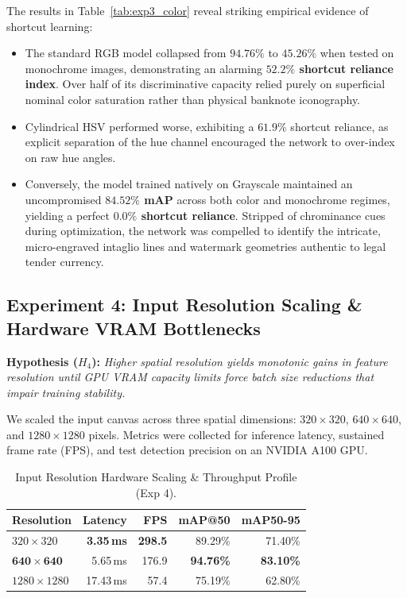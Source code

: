 \documentclass[conference]{IEEEtran}
\begin{document}
The results in Table~\ref{tab:exp3_color} reveal striking empirical evidence of shortcut learning:
\begin{itemize}
    \item The standard RGB model collapsed from $94.76\%$ to \textbf{$45.26\%$} when tested on monochrome images, demonstrating an alarming \textbf{$52.2\%$ shortcut reliance index}. Over half of its discriminative capacity relied purely on superficial nominal color saturation rather than physical banknote iconography.
    \item Cylindrical HSV performed worse, exhibiting a $61.9\%$ shortcut reliance, as explicit separation of the hue channel encouraged the network to over-index on raw hue angles.
    \item Conversely, the model trained natively on Grayscale maintained an uncompromised \textbf{$84.52\%$ mAP} across both color and monochrome regimes, yielding a perfect \textbf{$0.0\%$ shortcut reliance}. Stripped of chrominance cues during optimization, the network was compelled to identify the intricate, micro-engraved intaglio lines and watermark geometries authentic to legal tender currency.
\end{itemize}

\subsection{Experiment 4: Input Resolution Scaling \& Hardware VRAM Bottlenecks}
\label{subsec:exp4}

\noindent\textbf{Hypothesis ($H_4$):} \textit{Higher spatial resolution yields monotonic gains in feature resolution until GPU VRAM capacity limits force batch size reductions that impair training stability.}

We scaled the input canvas across three spatial dimensions: $320 \times 320$, $640 \times 640$, and $1280 \times 1280$ pixels. Metrics were collected for inference latency, sustained frame rate (FPS), and test detection precision on an NVIDIA A100 GPU.

\begin{table}[h]
\centering
\caption{Input Resolution Hardware Scaling \& Throughput Profile (Exp 4).}
\label{tab:exp4_resolution}
\scriptsize
\setlength{\tabcolsep}{3.0pt}
\begin{tabular}{lrrrr}
\toprule
\textbf{Resolution} & \textbf{Latency} & \textbf{FPS} & \textbf{mAP@50} & \textbf{mAP50-95} \\
\midrule
$320 \times 320$ & \textbf{3.35\,ms} & \textbf{298.5} & 89.29\% & 71.40\% \\
$\mathbf{640 \times 640}$ & 5.65\,ms & 176.9 & \textbf{94.76\%} & \textbf{83.10\%} \\
$1280 \times 1280$ & 17.43\,ms & 57.4 & 75.19\% & 62.80\% \\
\bottomrule
\end{tabular}
\end{table}
\end{document}
